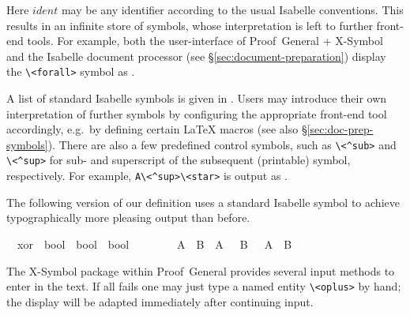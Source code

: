 \begin{isabellebody}
\begin{isamarkuptext}
  Here $ident$ may be any identifier according to the usual Isabelle
  conventions.  This results in an infinite store of symbols, whose
  interpretation is left to further front-end tools.  For example,
  both the user-interface of Proof~General + X-Symbol and the Isabelle
  document processor (see \S\ref{sec:document-preparation}) display
  the \verb,\,\verb,<forall>, symbol as \isa{{\isasymforall}}.

  A list of standard Isabelle symbols is given in
  \cite[appendix~A]{isabelle-sys}.  Users may introduce their own
  interpretation of further symbols by configuring the appropriate
  front-end tool accordingly, e.g.\ by defining certain {\LaTeX}
  macros (see also \S\ref{sec:doc-prep-symbols}).  There are also a
  few predefined control symbols, such as \verb,\,\verb,<^sub>, and
  \verb,\,\verb,<^sup>, for sub- and superscript of the subsequent
  (printable) symbol, respectively.  For example, \verb,A\<^sup>\<star>, is
  output as .

  \medskip The following version of our  definition uses a
  standard Isabelle symbol to achieve typographically more pleasing
  output than before.%
\end{isamarkuptext}%
\isamarkuptrue%
\isamarkupfalse%
\isamarkupfalse%
\isanewline
\ \ xor\ {\isacharcolon}{\isacharcolon}\ {\isachardoublequote}bool\ {\isasymRightarrow}\ bool\ {\isasymRightarrow}\ bool{\isachardoublequote}\ \ \ \ {\isacharparenleft}\ {\isachardoublequote}{\isasymoplus}{\isachardoublequote}\ {}{}{\isacharparenright}\isanewline
\ \ {\isachardoublequote}A\ {\isasymoplus}\ B\ {\isasymequiv}\ {\isacharparenleft}A\ {\isasymand}\ {\isasymnot}\ B{\isacharparenright}\ {\isasymor}\ {\isacharparenleft}{\isasymnot}\ A\ {\isasymand}\ B{\isacharparenright}{\isachardoublequote}\isamarkupfalse%
\isamarkupfalse%
%
\begin{isamarkuptext}%
\noindent The X-Symbol package within Proof~General provides several
  input methods to enter \isa{{\isasymoplus}} in the text.  If all fails one may
  just type a named entity \verb,\,\verb,<oplus>, by hand; the display
  will be adapted immediately after continuing input.


\end{isamarkuptext}
\end{isabellebody}
